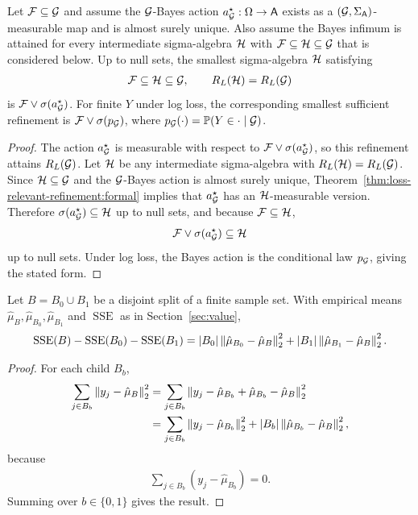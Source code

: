 \begin{theorem}
\label{thm:minimal-loss-sufficient:formal}
Let $\mathcal{F}\subseteq\mathcal{G}$ and assume the $\mathcal{G}$-Bayes action $a_{\mathcal{G}}^\star:\Omega\to\mathsf A$ exists as a $(\mathcal{G},\Sigma_{\mathsf A})$-measurable map and is almost surely unique. Also assume the Bayes infimum is attained for every intermediate sigma-algebra $\mathcal{H}$ with $\mathcal{F}\subseteq\mathcal{H}\subseteq\mathcal{G}$ that is considered below. Up to null sets, the smallest sigma-algebra $\mathcal{H}$ satisfying
\begin{align*}
\mathcal{F}\subseteq\mathcal{H}\subseteq\mathcal{G},
\qquad
R_L(\mathcal{H})=R_L(\mathcal{G})
\end{align*}
is $\mathcal{F}\vee\sigma(a_{\mathcal{G}}^\star)$. For finite $Y$ under log loss, the corresponding smallest sufficient refinement is $\mathcal{F}\vee\sigma(p_{\mathcal{G}})$, where $p_{\mathcal{G}}(\cdot)=\mathbb P(Y\in\cdot\mid\mathcal{G})$.
\end{theorem}
\begin{proof}
The action $a_{\mathcal{G}}^\star$ is measurable with respect to $\mathcal{F}\vee\sigma(a_{\mathcal{G}}^\star)$, so this refinement attains $R_L(\mathcal{G})$. Let $\mathcal{H}$ be any intermediate sigma-algebra with $R_L(\mathcal{H})=R_L(\mathcal{G})$. Since $\mathcal{H}\subseteq\mathcal{G}$ and the $\mathcal{G}$-Bayes action is almost surely unique, Theorem~\ref{thm:loss-relevant-refinement:formal} implies that $a_{\mathcal{G}}^\star$ has an $\mathcal{H}$-measurable version. Therefore $\sigma(a_{\mathcal{G}}^\star)\subseteq\mathcal{H}$ up to null sets, and because $\mathcal{F}\subseteq\mathcal{H}$,
\begin{align*}
\mathcal{F}\vee\sigma(a_{\mathcal{G}}^\star)\subseteq\mathcal{H}
\end{align*}
up to null sets. Under log loss, the Bayes action is the conditional law $p_{\mathcal{G}}$, giving the stated form.
\end{proof}

\begin{proposition}
\label{prop:sse-split:formal}
Let $B=B_0\cup B_1$ be a disjoint split of a finite sample set. With empirical means $\hat\mu_B,\hat\mu_{B_0},\hat\mu_{B_1}$ and $\operatorname{SSE}$ as in Section~\ref{sec:value},
\begin{align*}
\operatorname{SSE}(B)-\operatorname{SSE}(B_0)-\operatorname{SSE}(B_1)=\left\lvert B_0\right\rvert\left\lVert\hat\mu_{B_0}-\hat\mu_B\right\rVert_2^2+\left\lvert B_1\right\rvert\left\lVert\hat\mu_{B_1}-\hat\mu_B\right\rVert_2^2.
\end{align*}
\end{proposition}
\begin{proof}
For each child $B_b$,
\begin{align*}
\sum_{j\in B_b}\left\lVert y_j-\hat\mu_B\right\rVert_2^2&=\sum_{j\in B_b}\left\lVert y_j-\hat\mu_{B_b}+\hat\mu_{B_b}-\hat\mu_B\right\rVert_2^2\\
&=\sum_{j\in B_b}\left\lVert y_j-\hat\mu_{B_b}\right\rVert_2^2+\left\lvert B_b\right\rvert\left\lVert\hat\mu_{B_b}-\hat\mu_B\right\rVert_2^2,
\end{align*}
because
\begin{align*}
\sum_{j\in B_b}(y_j-\hat\mu_{B_b})=0.
\end{align*}
Summing over $b\in\{0,1\}$ gives the result.
\end{proof}
